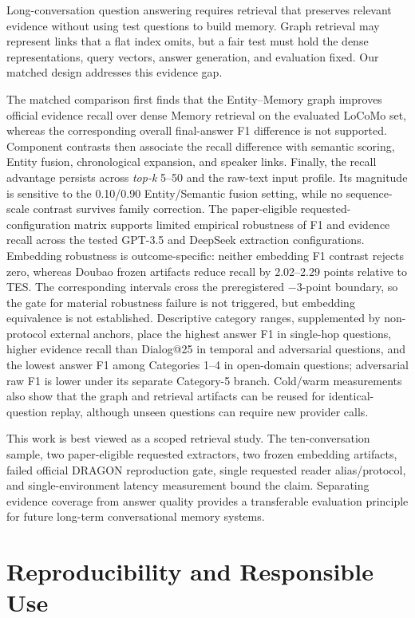 \documentclass[10pt,twocolumn]{article}
\newcommand{\topk}{\textit{top-k}}
\begin{document}
Long-conversation question answering requires retrieval that preserves
relevant evidence without using test questions to build memory. Graph
retrieval may represent links that a flat index omits, but a fair test must
hold the dense representations, query vectors, answer generation, and
evaluation fixed. Our matched design addresses this evidence gap.

The matched comparison first finds that the Entity--Memory graph improves
official evidence recall over dense Memory retrieval on the evaluated LoCoMo
set, whereas the corresponding overall final-answer F1 difference is not
supported. Component contrasts then associate the recall difference with
semantic scoring, Entity fusion, chronological expansion, and speaker links.
Finally, the recall advantage persists across \topk{} 5--50 and the raw-text
input profile. Its magnitude is sensitive to the 0.10/0.90 Entity/Semantic
fusion setting, while no sequence-scale contrast survives family correction.
The paper-eligible requested-configuration matrix supports limited empirical
robustness of F1 and evidence recall across the tested GPT-3.5 and DeepSeek
extraction configurations. Embedding robustness is outcome-specific: neither
embedding F1 contrast rejects zero, whereas Doubao frozen artifacts reduce
recall by 2.02--2.29 points relative to TES. The corresponding intervals cross
the preregistered $-3$-point boundary, so the gate for material robustness
failure is not triggered, but embedding equivalence is not established.
Descriptive category ranges, supplemented by non-protocol external anchors,
place the highest answer F1 in single-hop questions, higher evidence recall
than Dialog@25 in temporal and adversarial questions, and the lowest answer F1
among Categories 1--4 in open-domain questions; adversarial raw F1 is lower
under its separate Category-5 branch. Cold/warm measurements also show that the
graph and retrieval artifacts can be reused for identical-question replay,
although unseen questions can require new provider calls.

This work is best viewed as a scoped retrieval study. The ten-conversation
sample, two paper-eligible requested extractors, two frozen embedding
artifacts, failed official DRAGON reproduction gate, single requested reader
alias/protocol, and single-environment latency measurement bound the claim.
Separating evidence coverage from answer quality provides a transferable
evaluation principle for future long-term conversational memory systems.

\section*{Reproducibility and Responsible Use}
\end{document}
